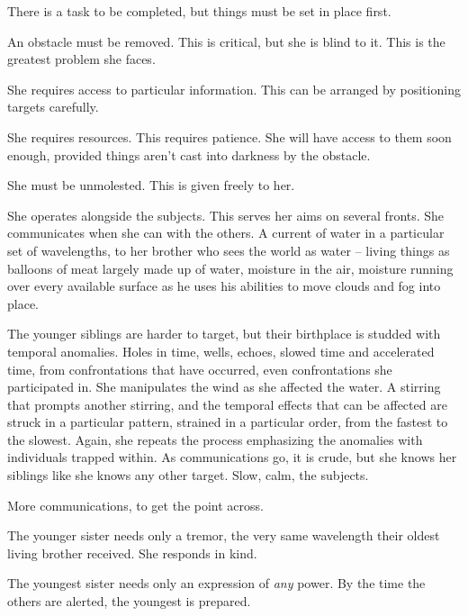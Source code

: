 There is a task to be completed, but things must be set in place first.



An obstacle must be removed.  This is critical, but she is blind to it.  This is the greatest problem she faces.



She requires access to particular information.  This can be arranged by positioning targets carefully.



She requires resources.  This requires patience.  She will have access to them soon enough, provided things aren't cast into darkness by the obstacle.



She must be unmolested.  This is given freely to her.



She operates alongside the subjects.  This serves her aims on several fronts.  She communicates when she can with the others.  A current of water in a particular set of wavelengths, to her brother who sees the world as water – living things as balloons of meat largely made up of water, moisture in the air, moisture running over every available surface as he uses his abilities to move clouds and fog into place.



The younger siblings are harder to target, but their birthplace is studded with temporal anomalies.  Holes in time, wells, echoes, slowed time and accelerated time, from confrontations that have occurred, even confrontations she participated in.  She manipulates the wind as she affected the water.  A stirring that prompts another stirring, and the temporal effects that can be affected are struck in a particular pattern, strained in a particular order, from the fastest to the slowest.  Again, she repeats the process emphasizing the anomalies with individuals trapped within.  As communications go, it is crude, but she knows her siblings like she knows any other target.  Slow, calm, the subjects.



More communications, to get the point across.



The younger sister needs only a tremor, the very same wavelength their oldest living brother received.  She responds in kind.



The youngest sister needs only an expression of \emph{any} power.  By the time the others are alerted, the youngest is prepared.



